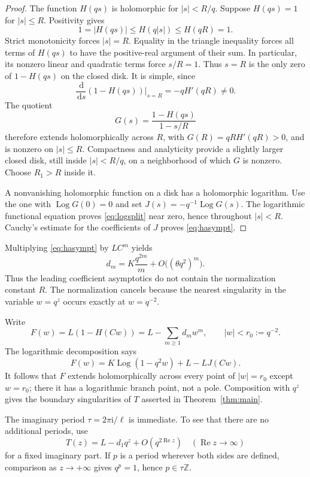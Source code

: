 \documentclass[11pt,letterpaper]{article}
\theoremstyle{definition}\newtheorem{definition}[theorem]{Definition}
\theoremstyle{remark}\newtheorem{remark}[theorem]{Remark}
\newcommand{\Ree}{\operatorname{Re}}
\newcommand{\dd}{\,\mathrm d}
\newcommand{\ii}{\mathrm i}
\newcommand{\Log}{\operatorname{Log}}
\numberwithin{equation}{section}
\begin{document}
\begin{proof}
The function $H(qs)$ is holomorphic for $|s|<R/q$. Suppose $H(qs)=1$ for $|s|\leq R$. Positivity gives
\[
 1=|H(qs)|\leq H(q|s|)\leq H(qR)=1.
\]
Strict monotonicity forces $|s|=R$. Equality in the triangle inequality forces all terms of $H(qs)$ to have the positive-real argument of their sum. In particular, its nonzero linear and quadratic terms force $s/R=1$. Thus $s=R$ is the only zero of $1-H(qs)$ on the closed disk. It is simple, since
\[
 \frac{\dd}{\dd s}(1-H(qs))\big|_{s=R}=-qH'(qR)\neq0.
\]
The quotient
\[
 G(s)=\frac{1-H(qs)}{1-s/R}
\]
therefore extends holomorphically across $R$, with $G(R)=qRH'(qR)>0$, and is nonzero on $|s|\leq R$. Compactness and analyticity provide a slightly larger closed disk, still inside $|s|<R/q$, on a neighborhood of which $G$ is nonzero. Choose $R_1>R$ inside it.

A nonvanishing holomorphic function on a disk has a holomorphic logarithm. Use the one with $\Log G(0)=0$ and set $J(s)=-q^{-1}\Log G(s)$. The logarithmic functional equation proves \eqref{eq:logsplit} near zero, hence throughout $|s|<R$. Cauchy's estimate for the coefficients of $J$ proves \eqref{eq:hasympt}.
\end{proof}

Multiplying \eqref{eq:hasympt} by $LC^m$ yields
\begin{equation}\label{eq:dasympt}
 d_m=K\frac{q^{2m}}m+O\bigl((\theta q^2)^m\bigr).
\end{equation}
Thus the leading coefficient asymptotics do not contain the normalization constant $R$. The normalization cancels because the nearest singularity in the variable $w=q^z$ occurs exactly at $w=q^{-2}$.

Write
\begin{equation}\label{eq:Fdef}
 F(w)=L(1-H(Cw))=L-\sum_{m\geq1}d_mw^m,
 \qquad |w|<r_0:=q^{-2}.
\end{equation}
The logarithmic decomposition says
\begin{equation}\label{eq:Flog}
 F(w)=K\Log(1-q^2w)+L-LJ(Cw).
\end{equation}
It follows that $F$ extends holomorphically across every point of $|w|=r_0$ except $w=r_0$; there it has a logarithmic branch point, not a pole. Composition with $q^z$ gives the boundary singularities of $T$ asserted in Theorem~\ref{thm:main}.

The imaginary period $\tau=2\pi\ii/\ell$ is immediate. To see that there are no additional periods, use
\[
 T(z)=L-d_1q^z+O(q^{2\Ree z})\quad(\Ree z\to\infty)
\]
for a fixed imaginary part. If $p$ is a period wherever both sides are defined, comparison as $z\to+\infty$ gives $q^p=1$, hence $p\in\tau\mathbb Z$.
\end{document}
